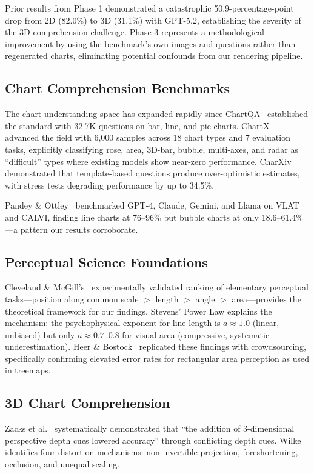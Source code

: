 \documentclass[sigconf, 10pt]{acmart}
\begin{document}
Prior results from Phase 1 demonstrated a catastrophic 50.9-percentage-point drop from 2D (82.0\%) to 3D (31.1\%) with GPT-5.2, establishing the severity of the 3D comprehension challenge. Phase 3 represents a methodological improvement by using the benchmark's own images and questions rather than regenerated charts, eliminating potential confounds from our rendering pipeline.

\subsection{Chart Comprehension Benchmarks}
The chart understanding space has expanded rapidly since ChartQA~\cite{chartqa} established the standard with 32.7K questions on bar, line, and pie charts. ChartX~\cite{chartx} advanced the field with 6,000 samples across 18 chart types and 7 evaluation tasks, explicitly classifying rose, area, 3D-bar, bubble, multi-axes, and radar as ``difficult'' types where existing models show near-zero performance. CharXiv~\cite{charxiv} demonstrated that template-based questions produce over-optimistic estimates, with stress tests degrading performance by up to 34.5\%.

Pandey \& Ottley~\cite{pandey2025} benchmarked GPT-4, Claude, Gemini, and Llama on VLAT and CALVI, finding line charts at 76--96\% but bubble charts at only 18.6--61.4\%---a pattern our results corroborate.

\subsection{Perceptual Science Foundations}
Cleveland \& McGill's~\cite{cleveland1984} experimentally validated ranking of elementary perceptual tasks---position along common scale $>$ length $>$ angle $>$ area---provides the theoretical framework for our findings. Stevens' Power Law explains the mechanism: the psychophysical exponent for line length is $a \approx 1.0$ (linear, unbiased) but only $a \approx 0.7$--$0.8$ for visual area (compressive, systematic underestimation). Heer \& Bostock~\cite{heer2010} replicated these findings with crowdsourcing, specifically confirming elevated error rates for rectangular area perception as used in treemaps.

\subsection{3D Chart Comprehension}
Zacks et al.~\cite{zacks1998} systematically demonstrated that ``the addition of 3-dimensional perspective depth cues lowered accuracy'' through conflicting depth cues. Wilke~\cite{wilke2019} identifies four distortion mechanisms: non-invertible projection, foreshortening, occlusion, and unequal scaling.
\end{document}
